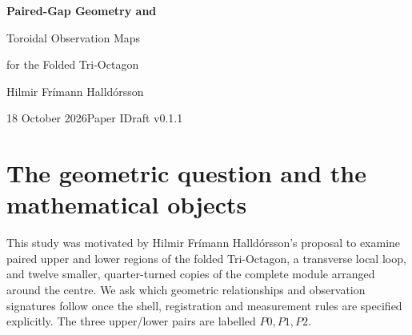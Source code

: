 \documentclass[11pt,a4paper]{article}
\begin{document}
\begin{center}
{\LARGE\bfseries Paired-Gap Geometry and\par Toroidal Observation Maps\par for the Folded Tri-Octagon\par}
\vspace{5mm}
{\large Hilmir Fr\'imann Halld\'orsson}\par
\vspace{3mm}18 October 2026\quad Paper I\quad Draft v0.1.1
\end{center}
\begin{abstract}
We study three paired upper/lower measurement regions of the width-one folded Tri-Octagon and complete quarter-turned reference modules placed around it. The material shell is the annulus established in Paper C; the toroidal constructions are additional geometry. Within a stated median circular family, normal crossing of a pair fixes a unique circle, with exact interior contacts and clearance from every filled panel. The six contacts cannot belong to one planar circle. A conditional uniform observation map resolves a registered three-vector from twelve frames, while its staged native-state records have generic real rank four rather than six. A second, explicitly conditional interface introduces six Euclidean delays. We prove a weighted transfer bound, a controlled differential-delay expansion, height/reflection identities, and an all-frequency inverse at aligned equatorial sites. A pure-delay tangential component and an off-ring blind-frequency example distinguish geometry from interference. Contact-onset and storage calculations show precisely why this comparator supplies neither imposed field boundary values nor a finite physical source-energy budget. Full proofs, source distinctions and static coordinate figures connect the author's paired-loop and multi-ring questions to these limited but explicit observation models.
\end{abstract}
\tableofcontents

\section{The geometric question and the mathematical objects}\label{sec:intro}
This study was motivated by Hilmir Fr\'imann Halld\'orsson's proposal to examine paired upper and lower regions of the folded Tri-Octagon, a transverse local loop, and twelve smaller, quarter-turned copies of the complete module arranged around the centre. We ask which geometric relationships and observation signatures follow once the shell, registration and measurement rules are specified explicitly. The three upper/lower pairs are labelled $P0,P1,P2$.~\cite{AuthorPair,AuthorScope}
\end{document}
